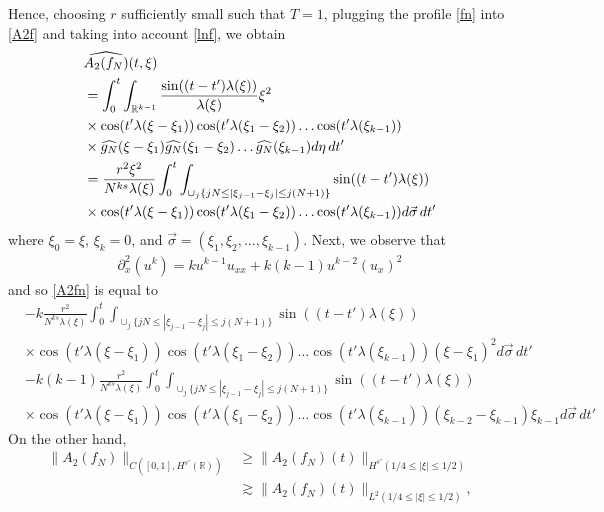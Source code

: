 \documentclass{amsart}
\newcommand{\wh}{\widehat}
\newcommand{\p}{\partial}
\begin{document}
Hence, choosing $r$ sufficiently small such that $T=1$, plugging the profile \eqref{fn} into \eqref{A2f} and taking into account \eqref{lnf}, we obtain
\begin{equation}
\aligned
&\widehat{A_2(f_N)}(t,\xi)\\
&=\int_0^t \int_{\mathbb{R}^{k-1}} \frac{\sin((t-t') \lambda(\xi))}{\lambda(\xi)} \xi^2 
\\
& \times \cos(t' \lambda(\xi- \xi_{1}))
\cos(t' \lambda(\xi_{1}- \xi_{2}))\dots\cos(t'\lambda(\xi_{k-1}))
\\
& \times \widehat{g_N}(\xi - \xi_{1})\widehat{g_N}(\xi_{1} - \xi_{2})\dots
\wh{g_{N}}(\xi_{k-1})
d \eta\,dt'\\
&=\frac{r^2 \xi^2}{N^{ks}\lambda(\xi)}\int_0^t \int_{\cup_{j}\{jN \leq |\xi_{j-1}-\xi_{j}|\leq j(N+1)\}}\sin((t-t') \lambda(\xi))
\\
& \times \cos(t' \lambda(\xi- \xi_{1}))
\cos(t' \lambda(\xi_{1}- \xi_{2}))\dots\cos(t'\lambda(\xi_{k-1}))d \vec{\sigma}\,dt'
\label{A2fn}
\endaligned
\end{equation}
where $\xi_{0} = \xi$, $\xi_{k} = 0$, and $\vec{\sigma} = (\xi_{1}, \xi_{2}, \dots, \xi_{k-1})$.
Next, we observe that
\begin{equation*}
\begin{split}
\p_{x}^	2(u^{k}) = ku^{k-1}u_{xx} + k(k-1)u^{k-2}(u_{x})^{2}
\end{split}
\end{equation*}
and so \eqref{A2fn} is equal to
\begin{equation}
  \label{fg}
\begin{split}
& -k\frac{r^2}{N^{ks}\lambda(\xi)}\int_0^t 
\int_{\cup_{j}\{jN \leq |\xi_{j-1}-\xi_{j}|\leq j(N+1)\}}
\sin((t-t') \lambda(\xi))
\\
& \times 
\cos(t' \lambda(\xi- \xi_{1}))
\cos(t' \lambda(\xi_{1}- \xi_{2}))\dots\cos(t'\lambda(\xi_{k-1}))
(\xi - \xi_{1})^{2}
d \vec{\sigma}\,dt'
\\
& - k(k-1)
\frac{r^2}{N^{ks}\lambda(\xi)}\int_0^t 
\int_{\cup_{j}\{jN \leq |\xi_{j-1}-\xi_{j}|\leq j(N+1)\}}
\sin((t-t') \lambda(\xi))
\\
& \times
\cos(t' \lambda(\xi- \xi_{1}))
\cos(t' \lambda(\xi_{1}- \xi_{2}))\dots\cos(t'\lambda(\xi_{k-1}))
(\xi_{k-2} - \xi_{k-1})\xi_{k-1}
d \vec{\sigma}\,dt'
\end{split}
\end{equation}
On the other hand,
\begin{equation}
  \begin{split}
\|A_2(f_N)\|_{C([0,1], H^{s'}(\mathbb{R}))} &\geq \|A_2(f_N)(t)\|_{H^{s'}(1/4\leq |\xi| \leq 1/2)}\\ &\gtrsim \|A_2(f_N)(t)\|_{L^2(1/4\leq |\xi| \leq 1/2)},
  \label{gh}
\end{split}
\end{equation}
\end{document}
